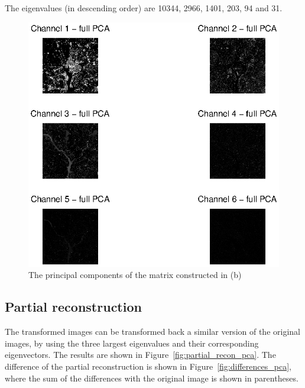 The eigenvalues (in descending order) are 10344, 2966, 1401, 203, 94 and 31.

\begin{figure}[htb]
 \centering
 \includegraphics[width=\linewidth]{full_pca.eps}
 \caption{The principal components of the matrix constructed in (b)}
 \label{fig:full_pca}
\end{figure}

\clearpage

\subsection{Partial reconstruction}
The transformed images can be transformed back a similar version of the original images, by using the three largest eigenvalues and their corresponding eigenvectors.
The results are shown in Figure~\ref{fig:partial_recon_pca}.
The difference of the partial reconstruction is shown in Figure~\ref{fig:differences_pca}, where the sum of the differences with the original image is shown in parentheses.

